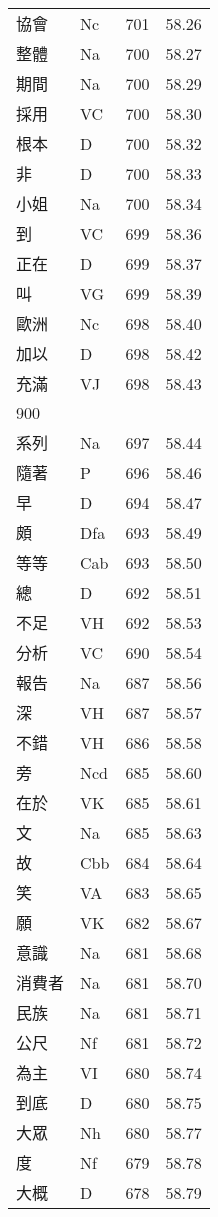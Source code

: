 \documentclass[twocolumn]{book}
\begin{document}
\begin{supertabular}{llrr}
協會 & Nc & 701 &  58.26\\
整體 & Na & 700 &  58.27\\
期間 & Na & 700 &  58.29\\
採用 & VC & 700 &  58.30\\
根本 & D & 700 &  58.32\\
非 & D & 700 &  58.33\\
小姐 & Na & 700 &  58.34\\
到 & VC & 699 &  58.36\\
正在 & D & 699 &  58.37\\
叫 & VG & 699 &  58.39\\
歐洲 & Nc & 698 &  58.40\\
加以 & D & 698 &  58.42\\
充滿 & VJ & 698 &  58.43\\
900\\
系列 & Na & 697 &  58.44\\
隨著 & P & 696 &  58.46\\
早 & D & 694 &  58.47\\
頗 & Dfa & 693 &  58.49\\
等等 & Cab & 693 &  58.50\\
總 & D & 692 &  58.51\\
不足 & VH & 692 &  58.53\\
分析 & VC & 690 &  58.54\\
報告 & Na & 687 &  58.56\\
深 & VH & 687 &  58.57\\
不錯 & VH & 686 &  58.58\\
旁 & Ncd & 685 &  58.60\\
在於 & VK & 685 &  58.61\\
文 & Na & 685 &  58.63\\
故 & Cbb & 684 &  58.64\\
笑 & VA & 683 &  58.65\\
願 & VK & 682 &  58.67\\
意識 & Na & 681 &  58.68\\
消費者 & Na & 681 &  58.70\\
民族 & Na & 681 &  58.71\\
公尺 & Nf & 681 &  58.72\\
為主 & VI & 680 &  58.74\\
到底 & D & 680 &  58.75\\
大眾 & Nh & 680 &  58.77\\
度 & Nf & 679 &  58.78\\
大概 & D & 678 &  58.79\\

\end{supertabular}
\end{document}
